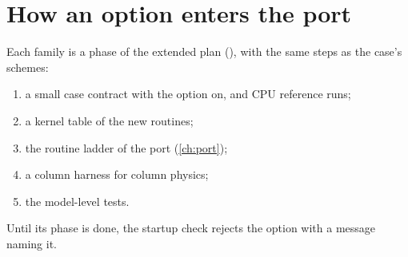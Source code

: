 \section{How an option enters the port}

Each family is a phase of the extended plan (), with the same steps as the
case's schemes:
\begin{enumerate}
  \item a small case contract with the option on, and CPU reference runs;
  \item a kernel table of the new routines;
  \item the routine ladder of the port (\cref{ch:port});
  \item a column harness for column physics;
  \item the model-level tests.
\end{enumerate}
Until its phase is done, the startup check rejects the option with a message naming it.
